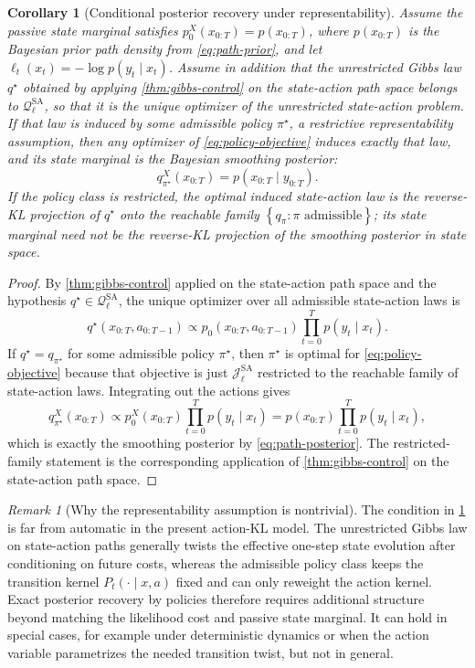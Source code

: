 \documentclass[11pt]{article}
\newcommand{\xtraj}{x_{0:T}}
\newcommand{\ytraj}{y_{0:T}}
\newcommand{\atraj}{a_{0:T-1}}
\newcommand{\set}[1]{\left\{ #1 \right\}}
\newcommand{\mc}{\mathcal}
\numberwithin{equation}{section}
\theoremstyle{plain}
\newtheorem{corollary}[theorem]{Corollary}
\theoremstyle{definition}
\theoremstyle{remark}
\newtheorem{remark}[theorem]{Remark}
\begin{document}
\begin{corollary}[Conditional posterior recovery under representability]
\label{cor:policy-posterior}
Assume the passive state marginal satisfies $p_0^X(\xtraj)=p(\xtraj)$, where $p(\xtraj)$ is the Bayesian prior path density from \cref{eq:path-prior}, and let $\ell_t(x_t)=-\log p(y_t\mid x_t)$. Assume in addition that the unrestricted Gibbs law $q^\star$ obtained by applying \cref{thm:gibbs-control} on the state-action path space belongs to $\mc Q_\ell^{\mathrm{SA}}$, so that it is the unique optimizer of the unrestricted state-action problem. If that law is induced by some admissible policy $\pi^\star$, a restrictive representability assumption, then any optimizer of \cref{eq:policy-objective} induces exactly that law, and its state marginal is the Bayesian smoothing posterior:
\begin{equation}
q_{\pi^\star}^{X}(\xtraj) = p(\xtraj\mid \ytraj).
\end{equation}
If the policy class is restricted, the optimal induced state-action law is the reverse-KL projection of $q^\star$ onto the reachable family $\set{q_\pi:\pi\text{ admissible}}$; its state marginal need not be the reverse-KL projection of the smoothing posterior in state space.
\end{corollary}

\begin{proof}
By \cref{thm:gibbs-control} applied on the state-action path space and the hypothesis $q^\star\in\mc Q_\ell^{\mathrm{SA}}$, the unique optimizer over all admissible state-action laws is
\[
q^\star(\xtraj,\atraj)
\propto
p_0(\xtraj,\atraj)\prod_{t=0}^{T}p(y_t\mid x_t).
\]
If $q^\star=q_{\pi^\star}$ for some admissible policy $\pi^\star$, then $\pi^\star$ is optimal for \cref{eq:policy-objective} because that objective is just $\mc J_\ell^{\mathrm{SA}}$ restricted to the reachable family of state-action laws. Integrating out the actions gives
\[
q_{\pi^\star}^{X}(\xtraj)
\propto
p_0^X(\xtraj)\prod_{t=0}^{T}p(y_t\mid x_t)
=
p(\xtraj)\prod_{t=0}^{T}p(y_t\mid x_t),
\]
which is exactly the smoothing posterior by \cref{eq:path-posterior}. The restricted-family statement is the corresponding application of \cref{thm:gibbs-control} on the state-action path space.
\end{proof}

\begin{remark}[Why the representability assumption is nontrivial]
\label{rem:policy-representability}
The condition in \cref{cor:policy-posterior} is far from automatic in the present action-KL model. The unrestricted Gibbs law on state-action paths generally twists the effective one-step state evolution after conditioning on future costs, whereas the admissible policy class keeps the transition kernel $P_t(\cdot\mid x,a)$ fixed and can only reweight the action kernel. Exact posterior recovery by policies therefore requires additional structure beyond matching the likelihood cost and passive state marginal. It can hold in special cases, for example under deterministic dynamics or when the action variable parametrizes the needed transition twist, but not in general.
\end{remark}
\end{document}
